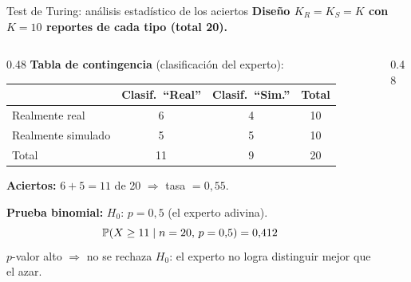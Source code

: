 \documentclass[aspectratio=1610, 10pt]{beamer}
\begin{document}
\begin{frame}{Test de Turing: análisis estadístico de los aciertos}
  \footnotesize
  \textbf{Diseño $K_R=K_S=K$ con $K=10$ reportes de cada tipo (total 20).}

  \vspace{2pt}
  \begin{columns}[T]
    \begin{column}{0.48\textwidth}
      \textbf{Tabla de contingencia} (clasificación del experto):
      \begin{center}\scriptsize
        \renewcommand{\arraystretch}{1.2}
        \begin{tabular}{l|cc|c}
          \toprule
          & Clasif.\ ``Real'' & Clasif.\ ``Sim.'' & Total \\
          \midrule
          Realmente real      & 6 & 4 & 10 \\
          Realmente simulado  & 5 & 5 & 10 \\
          \midrule
          Total               & 11 & 9 & 20 \\
          \bottomrule
        \end{tabular}
      \end{center}

      \vspace{2pt}
      \textbf{Aciertos:} $6+5=11$ de 20 $\Rightarrow$ tasa $=0{,}55$.

      \vspace{4pt}
      \textbf{Prueba binomial:} $H_0$: $p=0{,}5$ (el experto adivina).
      \[
        \mathbb{P}(X\geq 11\mid n=20,\,p=0{,}5) = 0{,}412
      \]
      $p$-valor alto $\Rightarrow$
      \textcolor{deepgreen}{no se rechaza $H_0$}: el experto no logra distinguir
      mejor que el azar.
    \end{column}
    \begin{column}{0.48\textwidth}
    \end{column}
  \end{columns}


\end{frame}
\end{document}
